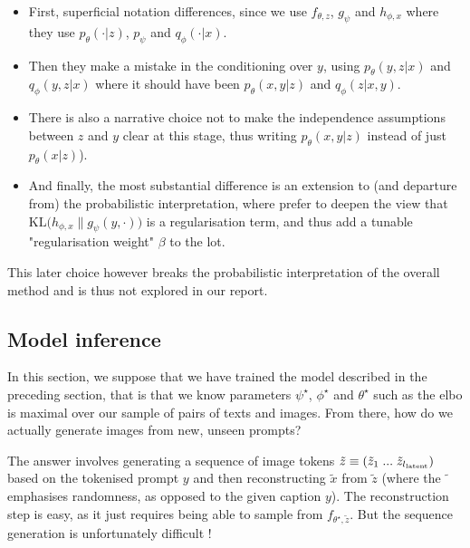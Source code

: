 \documentclass{article}
\begin{document}
\begin{multicols}{2}
\begin{itemize}
    \item First, superficial notation differences, since we use $f_{\theta,z}$, $g_\psi$ and $h_{\phi,x}$ where they use $p_\theta(\cdot|z)$, $p_\psi$ and $q_\phi(\cdot|x)$.
    \item Then they make a mistake in the conditioning over $y$, using $p_\theta(y,z|x)$ and $q_\phi(y,z|x)$ where it should have been $p_\theta(x,y|z)$ and $q_\phi(z|x,y)$.
    \item There is also a narrative choice not to make the independence assumptions between $z$ and $y$ clear at this stage, thus writing $p_\theta(x,y|z)$ instead of just $p_\theta(x|z)$).
    \item And finally, the most substantial difference is an extension to (and departure from) the probabilistic interpretation, where \citeauthor{zeroshot} prefer to deepen the view that $\textrm{KL}\Big( h_{\phi,x} \| g_\psi(y,\cdot) \Big)$ is a regularisation term, and thus add a tunable "regularisation weight" $\beta$ to the lot.
\end{itemize}   

This later choice however breaks the probabilistic interpretation of the overall method and is thus not explored in our report.

\subsection{Model inference} \label{sec:inference}

In this section, we suppose that we have trained the model described in the preceding section, that is that we know parameters $\psi^\star$, $\phi^\star$ and $\theta^\star$ such as the \gls{elbo} is maximal over our sample of pairs of texts and images. From there, how do we actually generate images from new, unseen prompts?

The answer involves generating a sequence of image tokens $\tilde z\equiv (\tilde z_1 \; ... \; \tilde z_{{l_{\mathrm{latent}}}})$ based on the tokenised prompt $y$ and then reconstructing $\tilde x$ from $ \tilde z$ (where the $\tilde{\phantom{x}}$ emphasises randomness, as opposed to the given caption $y$). The reconstruction step is easy, as it just requires being able to sample from $f_{\theta^\star, \tilde z}$. But the sequence generation is unfortunately difficult !


\end{multicols}
\end{document}
